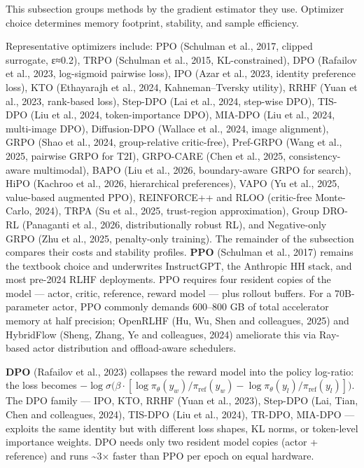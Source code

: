 This subsection groups methods by the gradient estimator they use. Optimizer choice determines memory footprint, stability, and sample efficiency.

Representative optimizers include: PPO (Schulman et al., 2017, clipped surrogate, ε≈0.2), TRPO (Schulman et al., 2015, KL-constrained), DPO (Rafailov et al., 2023, log-sigmoid pairwise loss), IPO (Azar et al., 2023, identity preference loss), KTO (Ethayarajh et al., 2024, Kahneman--Tversky utility), RRHF (Yuan et al., 2023, rank-based loss), Step-DPO (Lai et al., 2024, step-wise DPO), TIS-DPO (Liu et al., 2024, token-importance DPO), MIA-DPO (Liu et al., 2024, multi-image DPO), Diffusion-DPO (Wallace et al., 2024, image alignment), GRPO (Shao et al., 2024, group-relative critic-free), Pref-GRPO (Wang et al., 2025, pairwise GRPO for T2I), GRPO-CARE (Chen et al., 2025, consistency-aware multimodal), BAPO (Liu et al., 2026, boundary-aware GRPO for search), HiPO (Kachroo et al., 2026, hierarchical preferences), VAPO (Yu et al., 2025, value-based augmented PPO), REINFORCE++ and RLOO (critic-free Monte-Carlo, 2024), TRPA (Su et al., 2025, trust-region approximation), Group DRO-RL (Panaganti et al., 2026, distributionally robust RL), and Negative-only GRPO (Zhu et al., 2025, penalty-only training). The remainder of the subsection compares their costs and stability profiles. \textbf{PPO} (Schulman et al., 2017) remains the textbook choice and underwrites InstructGPT, the Anthropic HH stack, and most pre-2024 RLHF deployments. PPO requires four resident copies of the model --- actor, critic, reference, reward model --- plus rollout buffers. For a 70B-parameter actor, PPO commonly demands 600--800 GB of total accelerator memory at half precision; OpenRLHF (Hu, Wu, Shen and colleagues, 2025) and HybridFlow (Sheng, Zhang, Ye and colleagues, 2024) ameliorate this via Ray-based actor distribution and offload-aware schedulers.

\textbf{DPO} (Rafailov et al., 2023) collapses the reward model into the policy log-ratio: the loss becomes \(-\log \sigma\bigl(\beta \cdot [\log \pi_\theta(y_w)/\pi_{\mathrm{ref}}(y_w) - \log \pi_\theta(y_l)/\pi_{\mathrm{ref}}(y_l)]\bigr)\). The DPO family --- IPO, KTO, RRHF (Yuan et al., 2023), Step-DPO (Lai, Tian, Chen and colleagues, 2024), TIS-DPO (Liu et al., 2024), TR-DPO, MIA-DPO --- exploits the same identity but with different loss shapes, KL norms, or token-level importance weights. DPO needs only two resident model copies (actor + reference) and runs \textasciitilde3× faster than PPO per epoch on equal hardware.

